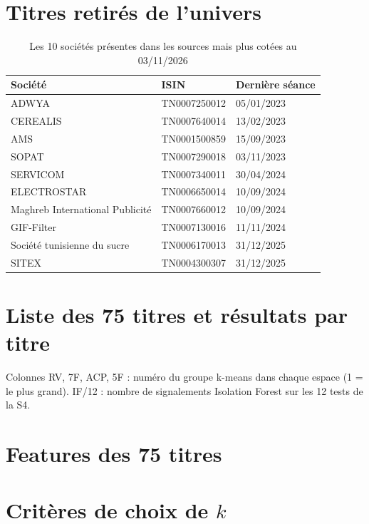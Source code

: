 \documentclass[11pt,a4paper]{article}
\begin{document}
\section{Titres retirés de l'univers}\label{ann:retires}
\begin{table}[H]\centering\small
\caption{Les 10 sociétés présentes dans les sources mais plus cotées au 03/11/2026}\label{tab:retires}
\begin{tabular}{lll}\toprule
Société & ISIN & Dernière séance \\ \midrule
ADWYA & TN0007250012 & 05/01/2023 \\
CEREALIS & TN0007640014 & 13/02/2023 \\
AMS & TN0001500859 & 15/09/2023 \\
SOPAT & TN0007290018 & 03/11/2023 \\
SERVICOM & TN0007340011 & 30/04/2024 \\
ELECTROSTAR & TN0006650014 & 10/09/2024 \\
Maghreb International Publicité & TN0007660012 & 10/09/2024 \\
GIF-Filter & TN0007130016 & 11/11/2024 \\
Société tunisienne du sucre & TN0006170013 & 31/12/2025 \\
SITEX & TN0004300307 & 31/12/2025 \\
\bottomrule\end{tabular}
\end{table}

\section{Liste des 75 titres et résultats par titre}\label{ann:titres}
Colonnes RV, 7F, ACP, 5F : numéro du groupe k-means dans chaque espace (1 = le plus grand). IF/12 : nombre de signalements Isolation Forest sur les 12 tests de la S4.
{\small}

\section{Features des 75 titres}\label{ann:features}
{\small}

\section{Critères de choix de \texorpdfstring{$k$}{k}}\label{ann:criteres}

\end{document}
